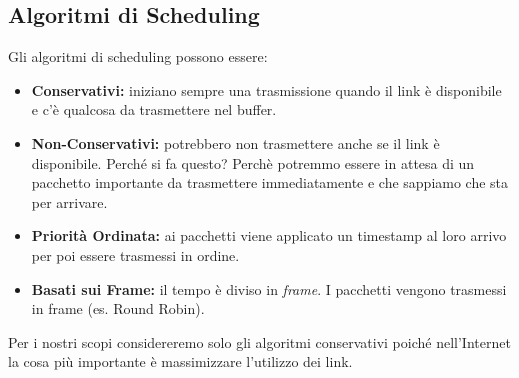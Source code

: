 \documentclass{article}
\begin{document}
\subsection{Algoritmi di Scheduling}
Gli algoritmi di scheduling possono essere:
\begin{itemize}
    \item \textbf{Conservativi: } iniziano sempre una trasmissione quando il link è disponibile e c'è qualcosa da trasmettere nel buffer.
    \item \textbf{Non-Conservativi: } potrebbero non trasmettere anche se il link è disponibile. Perché si fa questo? Perchè potremmo essere in attesa di un pacchetto importante da trasmettere immediatamente e che sappiamo che sta per arrivare.
    \item \textbf{Priorità Ordinata: } ai pacchetti viene applicato un timestamp al loro arrivo per poi essere trasmessi in ordine.
    \item \textbf{Basati sui Frame: } il tempo è diviso in \textit{frame}. I pacchetti vengono trasmessi in frame (es. Round Robin).
\end{itemize}
Per i nostri scopi considereremo solo gli algoritmi conservativi poiché nell'Internet la cosa più importante è massimizzare l'utilizzo dei link.
\end{document}
